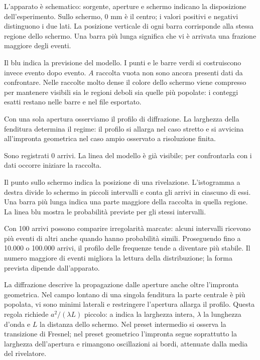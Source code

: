 L'apparato è schematico: sorgente, aperture e schermo indicano la disposizione dell'esperimento. Sullo schermo, 0 mm è il centro; i valori positivi e negativi distinguono i due lati. La posizione verticale di ogni barra corrisponde alla stessa regione dello schermo. Una barra più lunga significa che vi è arrivata una frazione maggiore degli eventi.\par

Il blu indica la previsione del modello. I punti e le barre verdi si costruiscono invece evento dopo evento. \(A\) raccolta vuota non sono ancora presenti dati da confrontare. Nelle raccolte molto dense il colore dello schermo viene compresso per mantenere visibili sia le regioni deboli sia quelle più popolate: i conteggi esatti restano nelle barre e nel file esportato.\par

Con una sola apertura osserviamo il profilo di diffrazione. La larghezza della fenditura determina il regime: il profilo si allarga nel caso stretto e si avvicina all'impronta geometrica nel caso ampio osservato a risoluzione finita.\par


Sono registrati 0 arrivi. La linea del modello è già visibile; per confrontarla con i dati occorre iniziare la raccolta.\par


Il punto sullo schermo indica la posizione di una rivelazione. L'istogramma a destra divide lo schermo in piccoli intervalli e conta gli arrivi in ciascuno di essi. Una barra più lunga indica una parte maggiore della raccolta in quella regione. La linea blu mostra le probabilità previste per gli stessi intervalli.\par

Con 100 arrivi possono comparire irregolarità marcate: alcuni intervalli ricevono più eventi di altri anche quando hanno probabilità simili. Proseguendo fino a 10.000 o 100.000 arrivi, il profilo delle frequenze tende a diventare più stabile. Il numero maggiore di eventi migliora la lettura della distribuzione; la forma prevista dipende dall'apparato.\par

La diffrazione descrive la propagazione dalle aperture anche oltre l'impronta geometrica. Nel campo lontano di una singola fenditura la parte centrale è più popolata, vi sono minimi laterali e restringere l'apertura allarga il profilo. Questa regola richiede \(a^{2}/(\lambda L)\) piccolo: a indica la larghezza intera, \(\lambda \) la lunghezza d'onda e \(L\) la distanza dello schermo. Nel preset intermedio si osserva la transizione di Fresnel; nel preset geometrico l'impronta segue soprattutto la larghezza dell'apertura e rimangono oscillazioni ai bordi, attenuate dalla media del rivelatore.\par

